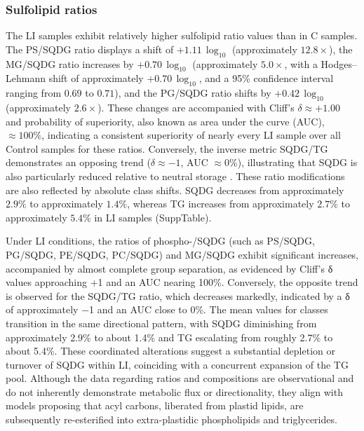 \documentclass[10pt,letterpaper]{article}
\begin{document}
\begin{itemize}
\subsubsection*{Sulfolipid ratios}
The LI samples exhibit relatively higher sulfolipid ratio values than in C samples. The PS/SQDG ratio displays a shift of $+1.11 \,\log_{10}$ (approximately $12.8\times$), the MG/SQDG ratio increases by $+0.70 \,\log_{10}$ (approximately $5.0\times$, with a Hodges--Lehmann shift of approximately $+0.70 \,\log_{10}$, and a 95\% confidence interval ranging from $0.69$ to $0.71$), and the PG/SQDG ratio shifts by $+0.42 \,\log_{10}$ (approximately $2.6\times$). These changes are accompanied with Cliff’s $\delta \approx +1.00$ and probability of superiority, also known as area under the curve (AUC), $\approx 100\%$, indicating a consistent superiority of nearly every LI sample over all Control samples for these ratios. Conversely, the inverse metric SQDG/TG demonstrates an opposing trend ($\delta \approx -1$, AUC $\approx 0\%$), illustrating that SQDG is also particularly reduced relative to neutral storage . These ratio modifications are also reflected by absolute class shifts. SQDG decreases from approximately $2.9\%$ to approximately $1.4\%$, whereas TG increases from approximately $2.7\%$ to approximately $5.4\%$ in LI samples (SuppTable). 

Under LI conditions, the ratios of phospho-/SQDG (such as PS/SQDG, PG/SQDG, PE/SQDG, PC/SQDG) and MG/SQDG exhibit significant increases, accompanied by almost complete group separation, as evidenced by Cliff’s δ values approaching +1 and an AUC nearing 100\%. Conversely, the opposite trend is observed for the SQDG/TG ratio, which decreases markedly, indicated by a δ of approximately $-$1 and an AUC close to 0\%. The mean values for classes transition in the same directional pattern, with SQDG diminishing from approximately 2.9\% to about 1.4\% and TG escalating from roughly 2.7\% to about 5.4\%. These coordinated alterations suggest a substantial depletion or turnover of SQDG within LI, coinciding with a concurrent expansion of the TG pool. Although the data regarding ratios and compositions are observational and do not inherently demonstrate metabolic flux or directionality, they align with models proposing that acyl carbons, liberated from plastid lipids, are subsequently re-esterified into extra-plastidic phospholipids and triglycerides.






\end{itemize}
\end{document}
